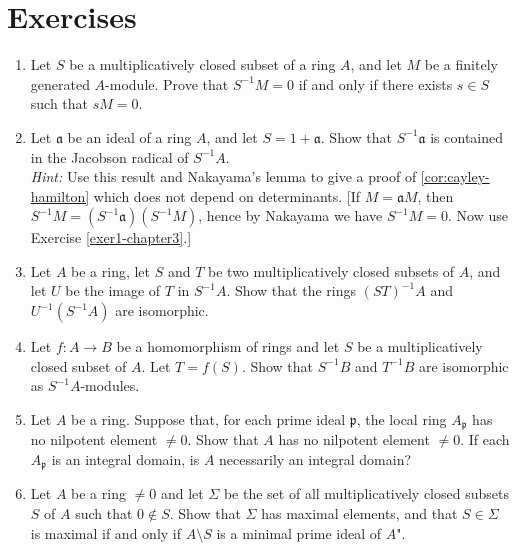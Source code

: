 \section*{Exercises}

\begin{enumerate}
    \item \label{exer1-chapter3}Let $S$ be a multiplicatively closed subset of a ring $A$, and let $M$ be a finitely generated $A$-module. Prove that $S^{-1}M = 0$ if and only if there exists $s \in S$ such that $sM = 0$.

    \item \label{exer2-chapter3}Let $\mathfrak{a}$ be an ideal of a ring $A$, and let $S = 1 + \mathfrak{a}$. Show that $S^{-1}\mathfrak{a}$ is contained in the Jacobson radical of $S^{-1}A$.\\
    \textit{Hint:} Use this result and Nakayama's lemma to give a proof of \eqref{cor:cayley-hamilton} which does not depend on determinants. [If $M = \mathfrak{a}M$, then $S^{-1}M = (S^{-1}\mathfrak{a})(S^{-1}M)$, hence by Nakayama we have $S^{-1}M = 0$. Now use Exercise \ref{exer1-chapter3}.]

    \item \label{exer3-chapter3}Let $A$ be a ring, let $S$ and $T$ be two multiplicatively closed subsets of $A$, and let $U$ be the image of $T$ in $S^{-1}A$. Show that the rings $(ST)^{-1}A$ and $U^{-1}(S^{-1}A)$ are isomorphic.

    \item \label{exer4-chapter3}Let $f \colon A \to B$ be a homomorphism of rings and let $S$ be a multiplicatively closed subset of $A$. Let $T = f(S)$. Show that $S^{-1}B$ and $T^{-1}B$ are isomorphic as $S^{-1}A$-modules.

    \item \label{exer5-chapter3}Let $A$ be a ring. Suppose that, for each prime ideal $\mathfrak{p}$, the local ring $A_{\mathfrak{p}}$ has no nilpotent element $\neq 0$. Show that $A$ has no nilpotent element $\neq 0$. If each $A_{\mathfrak{p}}$ is an integral domain, is $A$ necessarily an integral domain?

    \item \label{exer6-chapter3}Let $A$ be a ring $\neq 0$ and let $\Sigma$ be the set of all multiplicatively closed subsets $S$ of $A$ such that $0 \notin S$. Show that $\Sigma$ has maximal elements, and that $S \in \Sigma$ is maximal if and only if $A \setminus S$ is a minimal prime ideal of $A$".


\end{enumerate}
